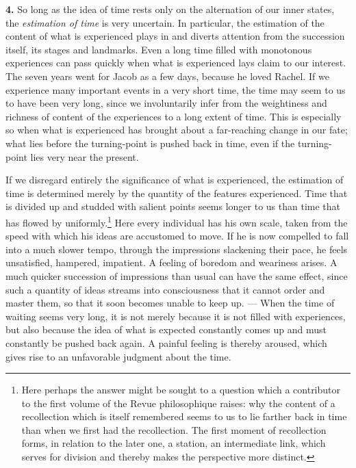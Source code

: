 \documentclass[12pt,a4paper]{book}
\newcommand{\opage}[1]{\marginnote{\footnotesize\textit{[#1]}}}
\begin{document}
\textbf{4.} So long as the idea of time rests only on the alternation of
our inner states, the \emph{estimation of time} is very uncertain. In
particular, the estimation of the content of what is experienced plays
in and diverts attention from the succession itself, its stages and
landmarks. Even a long time filled with monotonous experiences can pass
quickly when what is experienced lays claim to our interest. The seven
years went for Jacob as a few days, because he loved Rachel. If we
experience many important events in a very short time, the time may seem
to us to have been very long, since we involuntarily infer from the
weightiness and richness of content of the experiences to a long extent
of time. This is especially so when what is experienced has brought about
a far-reaching change in our fate; what lies before the turning-point is
pushed back in time, even if the turning-point lies very near the
present.

If we disregard entirely the significance of what is experienced, the
estimation of time is determined merely by the quantity of the features
experienced. Time that is divided up and studded with salient points
seems
\opage{232}longer to us than time that has flowed by uniformly.\footnote{Here
perhaps the answer might be sought to a question which a contributor to
the first volume of the Revue philosophique raises: why the content of a
recollection which is itself remembered seems to us to lie farther back
in time than when we first had the recollection. The first moment of
recollection forms, in relation to the later one, a station, an
intermediate link, which serves for division and thereby makes the
perspective more distinct.} Here every individual has his own scale,
taken from the speed with which his ideas are accustomed to move. If he
is now compelled to fall into a much slower tempo, through the
impressions slackening their pace, he feels unsatisfied, hampered,
impatient. A feeling of boredom and weariness arises. A much quicker
succession of impressions than usual can have the same effect, since
such a quantity of ideas streams into consciousness that it cannot order
and master them, so that it soon becomes unable to keep up. --- When the
time of waiting seems very long, it is not merely because it is not
filled with experiences, but also because the idea of what is expected
constantly comes up and must constantly be pushed back again. A painful
feeling is thereby aroused, which gives rise to an unfavorable judgment
about the time.
\end{document}
